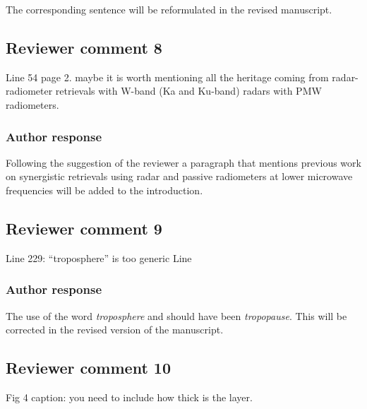 \documentclass[11pt]{scrartcl}
\begin{document}
The corresponding sentence will be reformulated in the revised manuscript.


\subsection*{Reviewer comment 8}

Line 54 page 2.  maybe it is worth mentioning all the heritage coming from radar-radiometer retrievals with W-band (Ka and Ku-band) radars with PMW radiometers. 

\subsubsection*{Author response}

Following the suggestion of the reviewer a paragraph that mentions previous work
on synergistic retrievals using radar and passive radiometers at lower microwave
frequencies will be added to the introduction.

%
%


\subsection*{Reviewer comment 9}
Line 229: “troposphere” is too generic Line

\subsubsection*{Author response}

The use of the word {\itshape troposphere} and should have been {\itshape tropopause}.
This will be corrected in the revised version of the manuscript.

\subsection*{Reviewer comment 10}
Fig 4 caption: you need to include how thick is the layer.
\end{document}
